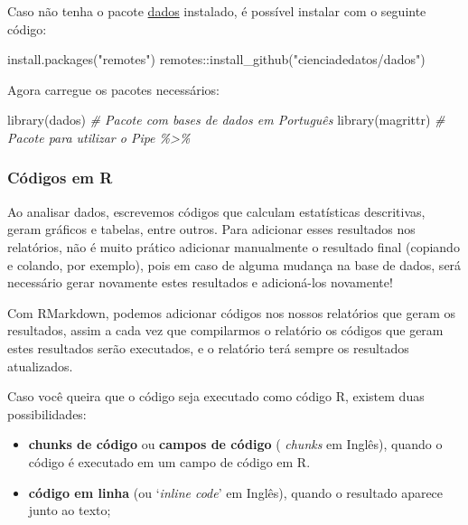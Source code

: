\documentclass[
]{book}
\newenvironment{Shaded}{\begin{snugshade}}{\end{snugshade}}
\newcommand{\CommentTok}[1]{\textcolor[rgb]{0.56,0.35,0.01}{\textit{#1}}}
\newcommand{\FunctionTok}[1]{\textcolor[rgb]{0.00,0.00,0.00}{#1}}
\newcommand{\NormalTok}[1]{#1}
\newcommand{\SpecialCharTok}[1]{\textcolor[rgb]{0.00,0.00,0.00}{#1}}
\newcommand{\StringTok}[1]{\textcolor[rgb]{0.31,0.60,0.02}{#1}}
\begin{document}
Caso não tenha o pacote \href{https://cienciadedatos.github.io/dados/}{dados} instalado, é possível instalar com o seguinte código:

\begin{Shaded}
\begin{Highlighting}[]
\FunctionTok{install.packages}\NormalTok{(}\StringTok{"remotes"}\NormalTok{)}
\NormalTok{remotes}\SpecialCharTok{::}\FunctionTok{install\_github}\NormalTok{(}\StringTok{"cienciadedatos/dados"}\NormalTok{)}
\end{Highlighting}
\end{Shaded}

Agora carregue os pacotes necessários:

\begin{Shaded}
\begin{Highlighting}[]
\FunctionTok{library}\NormalTok{(dados)  }\CommentTok{\# Pacote com bases de dados em Português}
\FunctionTok{library}\NormalTok{(magrittr)  }\CommentTok{\# Pacote para utilizar o Pipe \%\textgreater{}\%}
\end{Highlighting}
\end{Shaded}

\hypertarget{cuxf3digos-em-r}{%
\subsubsection{Códigos em R}\label{cuxf3digos-em-r}}

Ao analisar dados, escrevemos códigos que calculam estatísticas descritivas, geram gráficos e tabelas, entre outros.
Para adicionar esses resultados nos relatórios, não é muito prático adicionar manualmente o resultado final (copiando e colando, por exemplo), pois em caso de alguma mudança na base de dados, será necessário gerar novamente estes resultados e adicioná-los novamente!

Com RMarkdown, podemos adicionar códigos nos nossos relatórios que geram os resultados, assim a cada vez que compilarmos o relatório os códigos que geram estes resultados serão executados, e o relatório terá sempre os resultados atualizados.

Caso você queira que o código seja executado como código R, existem duas possibilidades:

\begin{itemize}
\item
  \textbf{chunks de código} ou \textbf{campos de código} ( \emph{chunks} em Inglês), quando o código é executado em um campo de código em R.
\item
  \textbf{código em linha} (ou `\emph{inline code}' em Inglês), quando o resultado aparece junto ao texto;
\end{itemize}
\end{document}
